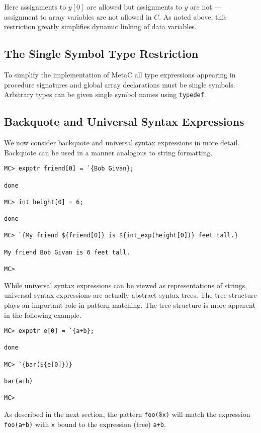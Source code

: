 \documentclass{article}
\begin{document}
Here assignments to $y[0]$ are allowed but assignments to $y$ are not --- assignment to array variables
are not allowed in $C$. As noted above, this restriction greatly simplifies dynamic linking of data variables.

\subsection{The Single Symbol Type Restriction}

To simplify the implementation of MetaC all type expressions appearing in procedure signatures and global array declarations must be single symbols.
Arbitrary types can be given single symbol names using {\tt typedef}.

\subsection{Backquote and Universal Syntax Expressions}

We now consider backquote and universal syntax expressions in more detail.  Backquote can be used in a manner analogous to string formatting.

\begin{verbatim}
MC> expptr friend[0] = `{Bob Givan};

done

MC> int height[0] = 6;

done

MC> `{My friend ${friend[0]} is ${int_exp(height[0])} feet tall.}

My friend Bob Givan is 6 feet tall.

MC> 
\end{verbatim}

While universal syntax expressions can be viewed as representations of strings, universal syntax
expressions are actually abstract syntax trees. The tree structure
plays an important role in pattern matching. The tree structure is
more apparent in the following example.

\begin{verbatim}
MC> expptr e[0] = `{a+b};

done

MC> `{bar(${e[0]})}

bar(a+b)

MC>
\end{verbatim}

As described in the next section, the pattern {\tt foo($\$$x)} will match the expression {\tt foo(a+b)} with {\tt x} bound to the expression (tree) {\tt a+b}.
\end{document}
